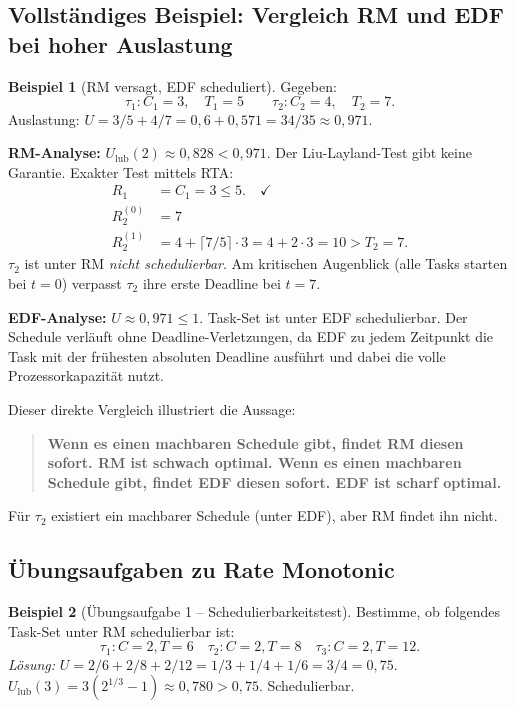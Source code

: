 ﻿\documentclass[a4paper,12pt]{report}
\theoremstyle{definition}
\newtheorem{beispiel}{Beispiel}[chapter]
\begin{document}
\subsection{Vollständiges Beispiel: Vergleich RM und EDF bei hoher Auslastung}

\begin{beispiel}[RM versagt, EDF scheduliert]
	\label{bsp:rm_edf_vergleich}
	Gegeben:
	\[
		\tau_1: C_1 = 3, \quad T_1 = 5 \qquad \tau_2: C_2 = 4, \quad T_2 = 7.
	\]
	Auslastung: $U = 3/5 + 4/7 = 0{,}6 + 0{,}571 = 34/35 \approx 0{,}971$.

	\textbf{RM-Analyse:}
	$U_{\text{lub}}(2) \approx 0{,}828 < 0{,}971$. Der Liu-Layland-Test gibt keine
	Garantie. Exakter Test mittels RTA:
	\begin{align*}
		R_1 &= C_1 = 3 \leq 5. \quad\checkmark \\
		R_2^{(0)} &= 7 \\
		R_2^{(1)} &= 4 + \lceil 7/5 \rceil \cdot 3 = 4 + 2 \cdot 3 = 10 > T_2 = 7.
	\end{align*}
	$\tau_2$ ist unter RM \emph{nicht schedulierbar}. Am kritischen Augenblick
	(alle Tasks starten bei $t=0$) verpasst $\tau_2$ ihre erste Deadline bei $t=7$.

	\textbf{EDF-Analyse:}
	$U \approx 0{,}971 \leq 1$. Task-Set ist unter EDF schedulierbar. Der Schedule
	verläuft ohne Deadline-Verletzungen, da EDF zu jedem Zeitpunkt die Task mit der
	frühesten absoluten Deadline ausführt und dabei die volle Prozessorkapazität nutzt.

	Dieser direkte Vergleich illustriert die Aussage:
	\begin{quote}
		\textbf{Wenn es einen machbaren Schedule gibt, findet RM diesen sofort. RM ist schwach optimal.
		Wenn es einen machbaren Schedule gibt, findet EDF diesen sofort. EDF ist scharf optimal.}
	\end{quote}
	Für $\tau_2$ existiert ein machbarer Schedule (unter EDF), aber RM findet ihn nicht.
\end{beispiel}

\subsection{Übungsaufgaben zu Rate Monotonic}

\begin{beispiel}[Übungsaufgabe 1 -- Schedulierbarkeitstest]
	Bestimme, ob folgendes Task-Set unter RM schedulierbar ist:
	\[
		\tau_1: C=2, T=6 \quad \tau_2: C=2, T=8 \quad \tau_3: C=2, T=12.
	\]
	\textit{Lösung:} $U = 2/6 + 2/8 + 2/12 = 1/3 + 1/4 + 1/6 = 3/4 = 0{,}75$.
	$U_{\text{lub}}(3) = 3(2^{1/3}-1) \approx 0{,}780 > 0{,}75$. Schedulierbar. \checkmark
\end{beispiel}
\end{document}

